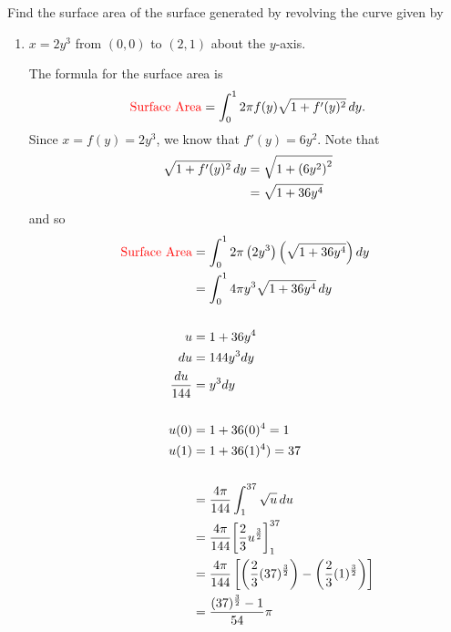 \documentclass[handout]{ximera}
\begin{document}
\begin{problem}
Find the surface area of the surface generated by revolving the curve given by
	\begin{enumerate}
			\item  $x = 2y^3$ from $\left( 0, 0 \right)$ to $\left( 2, 1 \right)$ about the $y$-axis.
		\begin{freeResponse}
		The formula for the surface area is
			\[
			\text{{\color{red} Surface Area}} = \int_0^{1} 2 \pi f(y) \sqrt{1+f'(y)^2} \mathop{}\!d y.
			\]
		Since $x = f(y) = 2y^3$, 
		we know that $f'(y) = 6y^2$.  
		Note that
			\begin{align*}
			\sqrt{1+f'(y)^2} \mathop{}\!d y  &= \sqrt{1+ \left( 6y^2 \right)^2}  \\
			&=  \sqrt{1+ 36y^4}  \\
			\end{align*}
		and so
			\begin{align*}
			\text{{\color{red} Surface Area}} &= \int_0^{1} 2 \pi \left(2y^3\right) \left(  \sqrt{1+ 36y^4} \right) \mathop{}\!d y  \\
			&= \int_0^{1} 4 \pi y^3  \sqrt{1+ 36y^4}  \mathop{}\!d y \\
			& \\
			u&=1+ 36y^4 \\
			du &= 144y^3dy \\
			\frac{du}{144} &= y^3dy \\
			& \\
			u(0)&=1+36(0)^4 = 1\\
			u(1)&= 1+ 36(1)^4) = 37 \\
			& \\
			&= \frac{4 \pi}{144} \int_1^{37}  \sqrt{u}  \mathop{}\!d u \\
			&= \frac{4 \pi}{144} \bigg[ \frac{2}{3}u^{\frac{3}{2}} \bigg]_1^{37}\\
			&= \frac{4 \pi}{144} \left[ \left( \frac{2}{3}(37)^{\frac{3}{2}} \right) - \left( \frac{2}{3}(1)^{\frac{3}{2}} \right) \right]  \\
			&= \frac{(37)^{\frac{3}{2}} -1 }{54}\pi
			\end{align*}
	
		\end{freeResponse}
	

\end{enumerate}
\end{problem}
\end{document}
